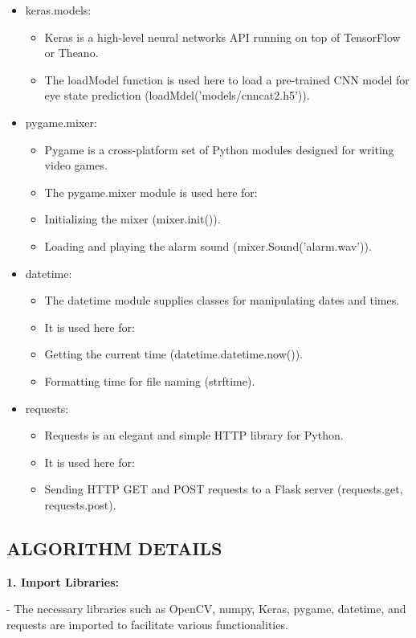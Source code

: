 \documentclass[12pt]{article}
\begin{document}
\begin{itemize}
\item keras.models:
\begin{itemize}
\item Keras is a high-level neural networks API running on top of TensorFlow or Theano.
\item The loadModel function is used here to load a pre-trained CNN model for eye state prediction (loadMdel('models/cnncat2.h5')).
\end{itemize}
\item pygame.mixer:
\begin{itemize}
\item Pygame is a cross-platform set of Python modules designed for writing video games.
\item The pygame.mixer module is used here for:
\item Initializing the mixer (mixer.init()).
\item Loading and playing the alarm sound (mixer.Sound('alarm.wav')).
\end{itemize}

\item datetime:

\begin{itemize}
\item The datetime module supplies classes for manipulating dates and times.
\item It is used here for:
\item Getting the current time (datetime.datetime.now()).
\item Formatting time for file naming (strftime).
\end{itemize} 

\item requests:
\begin{itemize}
\item Requests is an elegant and simple HTTP library for Python.
\item It is used here for:
\item Sending HTTP GET and POST requests to a Flask server (requests.get, requests.post).
\end{itemize}
\end{itemize}
\subsection{ALGORITHM DETAILS }


\textbf{1. Import Libraries:}

- The necessary libraries such as OpenCV, numpy, Keras, pygame, datetime, and requests are imported to facilitate various functionalities.\\
  
\end{document}
